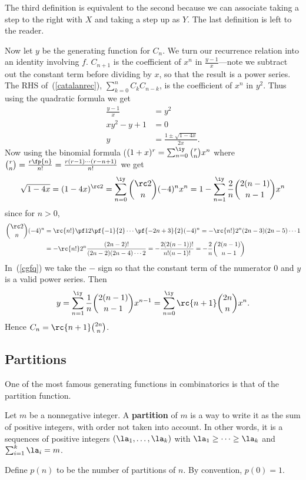 The third definition is equivalent to the second because we can associate taking a step to the right with $X$ and taking a step up as $Y$. The last definition is left to the reader.

Now let $y$ be the generating function for $C_n$. We turn our recurrence relation into an identity involving $f$. $C_{n+1}$ is the coefficient of $x^{n}$ in $\frac{y-1}x$---note we subtract out the constant term before dividing by $x$, so that the result is a power series.
The RHS of~(\ref{catalanrec}), $\sum_{k=0}^n C_kC_{n-k}$, is the coefficient of $x^n$ in $y^2$. Thus using the quadratic formula we get
\begin{align}
\nonumber \frac{y-1}{x}&=y^2\\
\nonumber xy^2-y+1&=0\\
\label{cgfq}y&=\frac{1\pm \sqrt{1-4x}}{2x}.
\end{align}
Now using the binomial formula ($(1+x)^r=\sum_{n=0}^{\iy}\binom rnx^n$ where $\binom rn=\frac{r\fp{n}}{n!}=\frac{r(r-1)\cdots (r-n+1)}{n!}$ we get
\[
\sqrt{1-4x}=(1-4x)^{\rc 2}=\sum_{n=0}^{\iy} \binom{\rc 2}{n} (-4)^nx^n=1-\sum_{n=1}^{\iy}\frac 2n\binom{2(n-1)}{n-1}x^n
\]
since for $n>0$,
\begin{align*}
\binom{\rc2}{n}(-4)^n&=\rc{n!}\pf12\pf{-1}{2}\cdots \pf{-2n+3}{2}(-4)^n=-\rc{n!}2^n(2n-3)(2n-5)\cdots 1\\
&=-\rc{n!}2^n\frac{(2n-2)!}{(2n-2)(2n-4)\cdots 2}=-\frac{2(2(n-1))!}{n!(n-1)!}=-\frac{2}{n}\binom{2(n-1)}{n-1}
\end{align*}
In~(\ref{cgfq}) we take the $-$ sign so that the constant term of the numerator 0 and $y$ is a valid power series. Then
\[
y=\sum_{n=1}^{\iy}\frac{1}{n}\binom{2(n-1)}{n-1}x^{n-1}=\sum_{n=0}^{\iy}\rc{n+1}\binom{2n}{n}x^n.
\]
Hence $C_n=\rc{n+1}\binom{2n}{n}$.
\subsection{Partitions}
One of the most famous generating functions in combinatorics is that of the partition function.
\begin{df}
Let $m$ be a nonnegative integer. 
A \textbf{partition} of $m$ is a way to write it as the sum of positive integers, with order not taken into account. In other words, it is a sequences of positive integers $(\la_1,\ldots, \la_k)$ with $\la_1\ge \cdots \ge \la_k$ and $\sum_{i=1}^k \la_i=m$.

Define $p(n)$ to be the number of partitions of $n$. By convention, $p(0)=1$.
\end{df}

